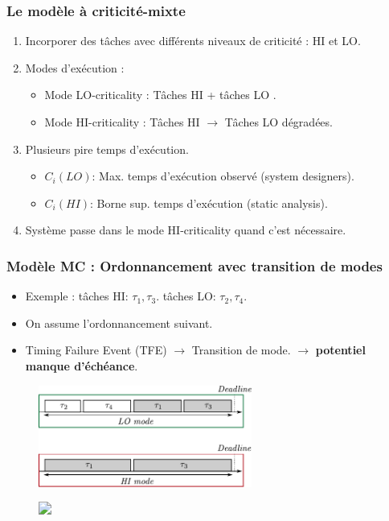 \documentclass[xcolor=table]{beamer}
\begin{document}

\begin{frame}
	\frametitle{Le modèle à criticité-mixte}
	\begin{enumerate}
		
		\item Incorporer des tâches avec différents niveaux de criticité : HI et LO.
		\item Modes d'exécution :
		\begin{itemize}
			\item Mode LO-criticality : Tâches HI  + tâches LO .
			\item Mode HI-criticality : Tâches HI  $\rightarrow$ Tâches LO dégradées.
		\end{itemize}
		\item Plusieurs pire temps d'exécution.
		\begin{itemize}
			\item $C_i(LO)$: Max. temps d'exécution observé (system designers).
			\item $C_i(HI)$: Borne sup. temps d'exécution (static analysis).
		\end{itemize}
		\item Système passe dans le mode HI-criticality quand c'est nécessaire.
	\end{enumerate}	
\end{frame}


\begin{frame}
	\frametitle{Modèle MC : Ordonnancement avec transition de modes}
	\begin{itemize}
		\item Exemple : tâches HI: $\tau_1, \tau_3$. tâches LO: $\tau_2, \tau_4$.
		\item On assume l'ordonnancement suivant.
		\item<2> Timing Failure Event (TFE) $\rightarrow$ Transition de mode. 
		$\rightarrow$ \textbf{potentiel manque d'échéance}.
	\end{itemize}
	
	\begin{figure}
		\includegraphics[width=7cm]{figs/mode_transition0}
	\end{figure}
	
	\begin{figure}
		\hspace{1cm}
		\includegraphics<2>[width=8.2cm]{figs/mode_transition}
	\end{figure}
	
\end{frame}
\end{document}
